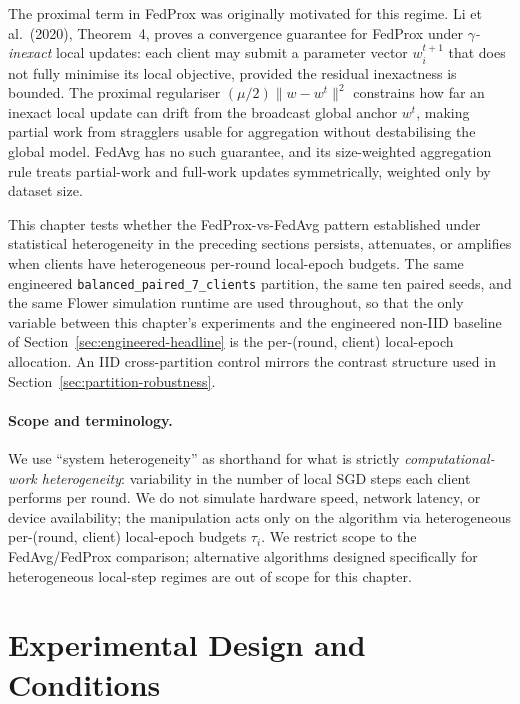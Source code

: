 \documentclass[11pt,a4paper]{report}
\begin{document}
The proximal term in FedProx was originally motivated for this
regime. Li et al.\ (2020), Theorem~4, proves a convergence
guarantee for FedProx under \emph{$\gamma$-inexact} local
updates: each client may submit a parameter vector
$w_i^{t+1}$ that does not fully minimise its local objective,
provided the residual inexactness is bounded. The proximal
regulariser $(\mu/2)\lVert w - w^t \rVert^2$ constrains how far
an inexact local update can drift from the broadcast global
anchor $w^t$, making partial work from stragglers usable for
aggregation without destabilising the global model. FedAvg has
no such guarantee, and its size-weighted aggregation rule
treats partial-work and full-work updates symmetrically,
weighted only by dataset size.

This chapter tests whether the FedProx-vs-FedAvg pattern
established under statistical heterogeneity in the preceding
sections persists, attenuates, or amplifies when clients have
heterogeneous per-round local-epoch budgets. The same
engineered \texttt{balanced\_paired\_7\_clients} partition,
the same ten paired seeds, and the same Flower simulation
runtime are used throughout, so that the only variable
between this chapter's experiments and the engineered
non-IID baseline of Section~\ref{sec:engineered-headline} is
the per-(round, client) local-epoch allocation. An IID
cross-partition control mirrors the contrast structure used in
Section~\ref{sec:partition-robustness}.

\paragraph{Scope and terminology.}
We use ``system heterogeneity'' as shorthand for what is
strictly \emph{computational-work heterogeneity}: variability
in the number of local SGD steps each client performs per
round. We do not simulate hardware speed, network latency, or
device availability; the manipulation acts only on the
algorithm via heterogeneous per-(round, client) local-epoch
budgets $\tau_i$. We restrict scope to the FedAvg/FedProx
comparison; alternative algorithms designed specifically for
heterogeneous local-step regimes are out of scope for this
chapter.

\section{Experimental Design and Conditions}
\label{sec:system-het-design}
\end{document}
